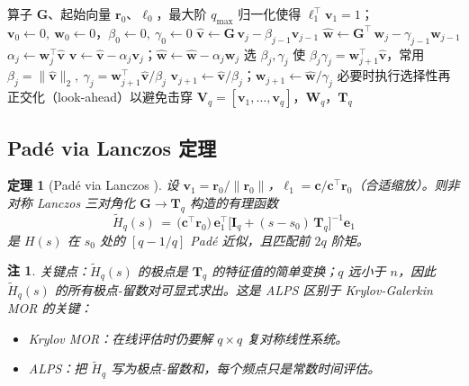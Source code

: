 \documentclass[11pt,a4paper]{ctexart}
\newtheorem{theorem}{定理}
\newtheorem{remark}{注}
\begin{document}
\begin{algorithm}[h]
\caption{非对称 Lanczos 过程（实现要点）}
\label{alg:lanczos}
\begin{algorithmic}[1]
\Require 算子 $\bm G$、起始向量 $\bm r_0$、$\bm \ell_0$，最大阶 $q_{\max}$
\State 归一化使得 $\bm \ell_1^{\!\top}\bm v_1 = 1$；$\bm v_0 \gets 0,\ \bm w_0\gets 0$，$\beta_0\gets 0,\ \gamma_0\gets 0$
  \State $\hat{\bm v} \gets \bm G\,\bm v_j - \beta_{j-1}\bm v_{j-1}$
  \State $\hat{\bm w} \gets \bm G^{\!\top}\,\bm w_j - \gamma_{j-1}\bm w_{j-1}$
  \State $\alpha_j \gets \bm w_j^{\!\top}\hat{\bm v}$
  \State $\hat{\bm v}\gets \hat{\bm v}-\alpha_j\bm v_j$；\quad $\hat{\bm w}\gets \hat{\bm w}-\alpha_j\bm w_j$
  \State 选 $\beta_j,\gamma_j$ 使 $\beta_j\gamma_j = \bm w_{j+1}^{\!\top}\hat{\bm v}$，常用 $\beta_j = \|\hat{\bm v}\|_2,\ \gamma_j = \bm w_{j+1}^{\!\top}\hat{\bm v}/\beta_j$
  \State $\bm v_{j+1}\gets \hat{\bm v}/\beta_j$；\quad $\bm w_{j+1}\gets \hat{\bm w}/\gamma_j$
  \State 必要时执行选择性再正交化（look-ahead）以避免击穿
\EndFor
\State \Return $\bm V_q = [\bm v_1,\dots,\bm v_q]$，$\bm W_q$，$\bm T_q$
\end{algorithmic}
\end{algorithm}

\subsection{Padé via Lanczos 定理}

\begin{theorem}[Padé via Lanczos \cite{Gragg1974,Freund1995}]
\label{thm:padelanczos}
设 $\bm v_1 = \bm r_0/\|\bm r_0\|$，$\bm \ell_1 = \bm c/\bm c^{\!\top}\bm r_0$（合适缩放）。则非对称 Lanczos 三对角化 $\bm G\to \bm T_q$ 构造的有理函数
\begin{equation}
  \widetilde H_q(s) \,=\, \big(\bm c^{\!\top}\bm r_0\big)\,\bm e_1^{\!\top}\big[\bm I_q + (s-s_0)\,\bm T_q\big]^{-1}\bm e_1
  \label{eq:pade-lanczos}
\end{equation}
是 $H(s)$ 在 $s_0$ 处的 $[q-1/q]$ Padé 近似，且匹配前 $2q$ 阶矩。
\end{theorem}

\begin{remark}
关键点：$\widetilde H_q(s)$ 的极点是 $\bm T_q$ 的特征值的简单变换；$q$ 远小于 $n$，因此 $\widetilde H_q(s)$ 的所有极点-留数对可\emph{显式}求出。这是 ALPS 区别于 Krylov-Galerkin MOR 的关键：
\begin{itemize}
\item Krylov MOR：在线评估时仍要解 $q\times q$ 复对称线性系统。
\item ALPS：把 $\widetilde H_q$ 写为极点-留数和，每个频点只是常数时间评估。
\end{itemize}
\end{remark}
\end{document}
